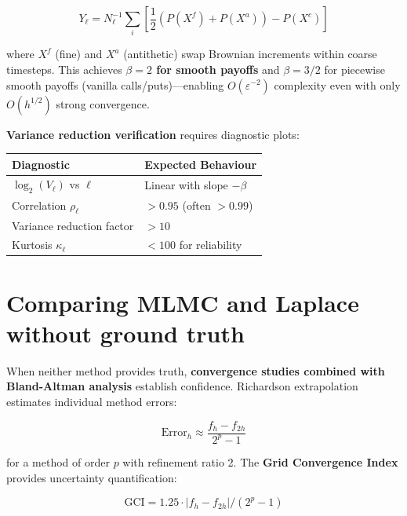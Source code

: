 \documentclass[11pt,a4paper]{article}
\begin{document}
\begin{equation}
Y_\ell = N_\ell^{-1}\sum_i \left[\frac{1}{2}(P(X^f) + P(X^a)) - P(X^c)\right]
\end{equation}

\noindent where $X^f$ (fine) and $X^a$ (antithetic) swap Brownian increments within coarse timesteps. This achieves \textbf{$\beta = 2$ for smooth payoffs} and $\beta = 3/2$ for piecewise smooth payoffs (vanilla calls/puts)---enabling $O(\varepsilon^{-2})$ complexity even with only $O(h^{1/2})$ strong convergence.

\vspace{0.2cm}

\noindent \textbf{Variance reduction verification} requires diagnostic plots:

\vspace{0.3cm}

\begin{center}
\begin{tabular}{@{}ll@{}}
\toprule
\textbf{Diagnostic} & \textbf{Expected Behaviour} \\
\midrule
$\log_2(V_\ell)$ vs $\ell$ & Linear with slope $-\beta$ \\
Correlation $\rho_\ell$ & $> 0.95$ (often $> 0.99$) \\
Variance reduction factor & $> 10$ \\
Kurtosis $\kappa_\ell$ & $< 100$ for reliability \\
\bottomrule
\end{tabular}
\end{center}

\section{Comparing MLMC and Laplace without ground truth}

When neither method provides truth, \textbf{convergence studies combined with Bland-Altman analysis} establish confidence. Richardson extrapolation estimates individual method errors:

\begin{equation}
\text{Error}_h \approx \frac{f_h - f_{2h}}{2^p - 1}
\end{equation}

\noindent for a method of order $p$ with refinement ratio 2. The \textbf{Grid Convergence Index} provides uncertainty quantification:

\begin{equation}
\text{GCI} = 1.25 \cdot |f_h - f_{2h}|/(2^p - 1)
\end{equation}
\end{document}
